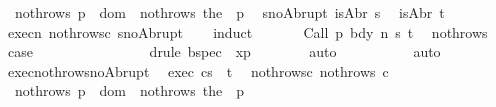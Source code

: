 \begin{isabellebody}
\ \ nothrows{\isacharunderscore}{\isasymGamma}{\isacharcolon}\ {\isachardoublequoteopen}{\isasymforall}p\ {\isasymin}\ dom\ {\isasymGamma}{\isachardot}\ nothrows\ {\isacharparenleft}the\ {\isacharparenleft}{\isasymGamma}\ p{\isacharparenright}{\isacharparenright}{\isachardoublequoteclose}\isanewline
\ \ s{\isacharunderscore}no{\isacharunderscore}Abrupt{\isacharcolon}\ {\isachardoublequoteopen}{\isasymnot}{\isacharparenleft}isAbr\ s{\isacharparenright}{\isachardoublequoteclose}\isanewline
\ \ {\isachardoublequoteopen}{\isasymnot}{\isacharparenleft}isAbr\ t{\isacharparenright}{\isachardoublequoteclose}\isanewline
%
\isadelimproof
\ \ %
\endisadelimproof
%
\isatagproof
{}\isamarkupfalse%
\ execn\ nothrows{\isacharunderscore}c\ s{\isacharunderscore}no{\isacharunderscore}Abrupt\isanewline
\ \ \isamarkupfalse%
\ {\isacharparenleft}induct{\isacharparenright}\ \isanewline
\ \ \ \ \isamarkupfalse%
\ {\isacharparenleft}Call\ p\ bdy\ n\ s\ t{\isacharparenright}\ \isamarkupfalse%
\ nothrows{\isacharunderscore}{\isasymGamma}\ \isamarkupfalse%
\ {\isacharquery}case\isanewline
\ \ \ \ \ \ \isamarkupfalse%
\ {\isacharminus}\isanewline
\ \ \ \ \ \ \isamarkupfalse%
\ {\isacharparenleft}drule\ bspec\ {\isacharbrackleft}\ x{\isacharequal}p{\isacharbrackright}{\isacharparenright}\isanewline
\ \ \ \ \ \ \isamarkupfalse%
\ auto\isanewline
\ \ \ \ \ \ \isamarkupfalse%
\isanewline
\ \ \isamarkupfalse%
\ {\isacharparenleft}auto{\isacharparenright}%
\endisatagproof
{\isafoldproof}%
%
\isadelimproof
\isanewline
%
\endisadelimproof
\isanewline
{}\isamarkupfalse%
\ exec{\isacharunderscore}nothrows{\isacharunderscore}no{\isacharunderscore}Abrupt{\isacharcolon}\isanewline
\ \ exec{\isacharcolon}\ {\isachardoublequoteopen}{\isasymGamma}{\isasymturnstile}{\isasymlangle}c{\isacharcomma}s{\isasymrangle}\ {\isasymRightarrow}\ t{\isachardoublequoteclose}\isanewline
\ \ nothrows{\isacharunderscore}c{\isacharcolon}\ {\isachardoublequoteopen}nothrows\ c{\isachardoublequoteclose}\isanewline
\ \ nothrows{\isacharunderscore}{\isasymGamma}{\isacharcolon}\ {\isachardoublequoteopen}{\isasymforall}p\ {\isasymin}\ dom\ {\isasymGamma}{\isachardot}\ nothrows\ {\isacharparenleft}the\ {\isacharparenleft}{\isasymGamma}\ p{\isacharparenright}{\isacharparenright}{\isachardoublequoteclose}\isanewline

\end{isabellebody}
